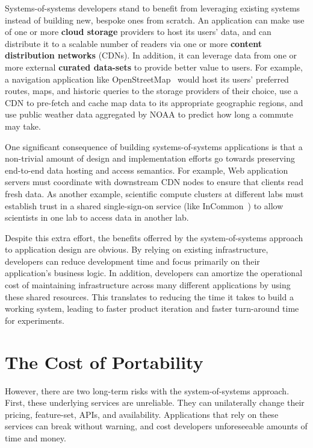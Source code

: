 Systems-of-systems developers stand to benefit
from leveraging existing systems instead of building new, bespoke ones from
scratch.  An application can make use of one or more \textbf{cloud storage}
providers to host its users' data,
and can distribute it to a scalable number of readers via one or more \textbf{content
distribution networks} (CDNs).  In addition, it can leverage data from
one or more external \textbf{curated data-sets} to provide better value to users.
For example, a navigation application like OpenStreetMap~\cite{openstreetmap} would host its users'
preferred routes, maps, and historic queries to the storage providers of their choice,
use a CDN to pre-fetch and cache map data to its appropriate geographic regions,
and use public weather data aggregated by NOAA to predict how long a commute may take.

One significant consequence of building systems-of-systems applications
is that a non-trivial amount of design and implementation efforts go towards
preserving end-to-end data hosting and access semantics.  For example, Web
application servers must coordinate with downstream CDN nodes to ensure that
clients read fresh data.  As another example, scientific compute clusters at
different labs must establish trust in a shared single-sign-on service (like
InCommon~\cite{incommon}) to allow scientists in one lab to access data in
another lab.

Despite this extra effort, the benefits offerred by the system-of-systems
approach to application design are obvious.  By relying on existing infrastructure,
developers can reduce development time and focus primarily on their application's business
logic.  In addition, developers can amortize the operational cost of
maintaining infrastructure across many different applications by using these
shared resources.  This translates to reducing the time it takes to build a
working system, leading to faster product iteration and faster turn-around time
for experiments.

\section{The Cost of Portability}

However, there are two long-term risks with the system-of-systems approach.
First, these underlying services are unreliable.  They can unilaterally
change their pricing, feature-set, APIs, and availability.
Applications that rely on these services can break without warning,
and cost developers unforeseeable amounts of time and money.

